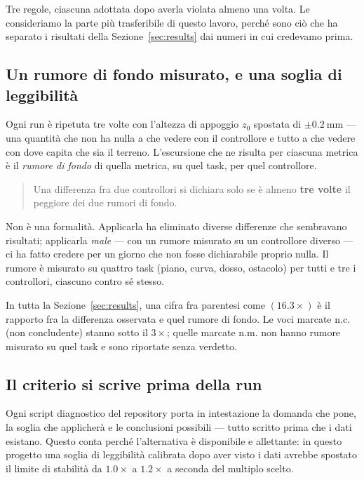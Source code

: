 \documentclass[11pt,a4paper]{article}
\begin{document}
Tre regole, ciascuna adottata dopo averla violata almeno una volta. Le
consideriamo la parte pi\`u trasferibile di questo lavoro, perch\'e sono ci\`o che
ha separato i risultati della Sezione~\ref{sec:results} dai numeri in cui
credevamo prima.

\subsection{Un rumore di fondo misurato, e una soglia di leggibilit\`a}
\label{sec:noise}

Ogni run \`e ripetuta tre volte con l'altezza di appoggio $z_0$ spostata di
$\pm\SI{0.2}{\milli\meter}$ --- una quantit\`a che non ha nulla a che vedere con
il controllore e tutto a che vedere con dove capita che sia il terreno.
L'escursione che ne risulta per ciascuna metrica \`e il \emph{rumore di fondo}
di quella metrica, su quel task, per quel controllore.

\begin{quote}
Una differenza fra due controllori si dichiara solo se \`e almeno
\textbf{tre volte} il peggiore dei due rumori di fondo.
\end{quote}

Non \`e una formalit\`a. Applicarla ha eliminato diverse differenze che
sembravano risultati; applicarla \emph{male} --- con un rumore misurato su un
controllore diverso --- ci ha fatto credere per un giorno che non fosse
dichiarabile proprio nulla. Il rumore \`e misurato su quattro task (piano,
curva, dosso, ostacolo) per tutti e tre i controllori, ciascuno contro s\'e
stesso.

In tutta la Sezione~\ref{sec:results}, una cifra fra parentesi come
$(16.3\times)$ \`e il rapporto fra la differenza osservata e quel rumore di
fondo. Le voci marcate \textsf{n.c.} (non concludente) stanno sotto il
$3\times$; quelle marcate \textsf{n.m.} non hanno rumore misurato su quel task
e sono riportate senza verdetto.

\subsection{Il criterio si scrive prima della run}

Ogni script diagnostico del repository porta in intestazione la domanda che
pone, la soglia che applicher\`a e le conclusioni possibili --- tutto scritto
prima che i dati esistano. Questo conta perch\'e l'alternativa \`e disponibile e
allettante: in questo progetto una soglia di leggibilit\`a calibrata dopo aver
visto i dati avrebbe spostato il limite di stabilit\`a da $1.0\times$ a
$1.2\times$ a seconda del multiplo scelto.
\end{document}
